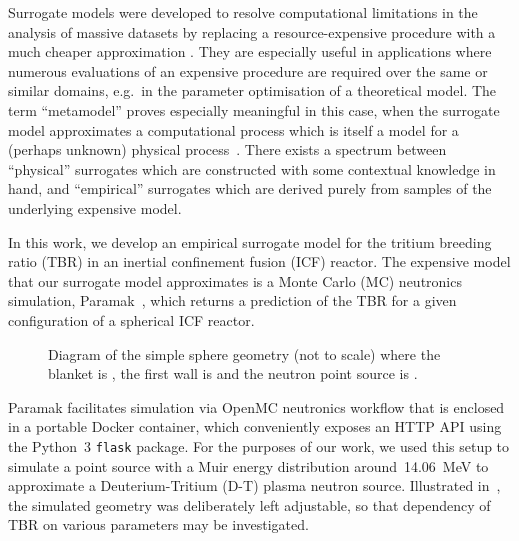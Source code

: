 Surrogate models were developed to resolve computational limitations in the analysis of massive datasets by replacing a resource-expensive procedure with a much cheaper approximation
\cite{Sondergaard2003}. They are especially useful in applications where
numerous evaluations of an expensive procedure are required over the same or
similar domains, e.g.~in the parameter optimisation of a theoretical model. The
term ``metamodel'' proves especially meaningful in this case, when the surrogate
model approximates a computational process which is itself a model for a
(perhaps unknown) physical process~\cite{Myers2002}. There exists a spectrum
between ``physical'' surrogates which are constructed with some contextual
knowledge in hand, and ``empirical'' surrogates which are derived purely from
samples of the underlying expensive model.

In this work, we develop an empirical surrogate model for the tritium breeding
ratio (TBR) in an inertial confinement fusion (ICF) reactor. The expensive model
that our surrogate model approximates is a Monte Carlo (MC) neutronics
simulation, Paramak~\cite{paramak}, which returns a prediction of the TBR for a given
configuration of a spherical ICF reactor.

\begin{figure}[!ht]
  \centering

    \caption{Diagram of the simple sphere geometry (not to scale) where the blanket is , the first wall is  and the neutron point source is .}
    \label{fig:model_diagram}
\end{figure}

Paramak facilitates simulation via OpenMC neutronics workflow that is enclosed in
a portable Docker container, which conveniently exposes an HTTP API using the
Python~3 \texttt{flask} package. For the purposes of our work, we used this setup to
simulate a point source with a Muir energy distribution \cite{openmcmuir}
around~\SI{14.06}{\mega\electronvolt} to approximate a Deuterium-Tritium (D-T)
plasma neutron source. Illustrated in~, the simulated
geometry was deliberately left adjustable, so that dependency of TBR on various
parameters may be investigated.

